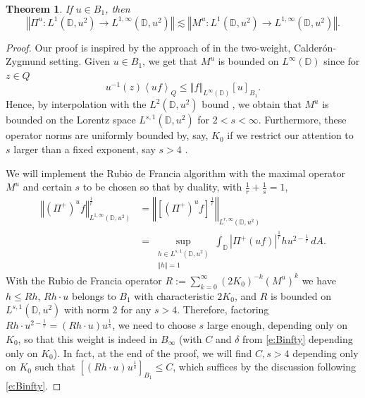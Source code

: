 \documentclass{amsart}
\newcommand{\norm}[1]{\left\Vert {#1}\right\Vert}
\newcommand{\avg}[1]{\left\langle {#1}\right\rangle}
\newtheorem{theorem}{Theorem}[section]
\theoremstyle{definition}
\numberwithin{equation}{section}
\begin{document}
\begin{theorem}\label{thm:Pi-M1}
If $u \in B_1$, then 
	\[ \norm{\Pi^u\colon L^1(\mathbb{D},u^2) \to L^{1,\infty}(\mathbb{D},u^2) } \lesssim \norm{M^u\colon L^1(\mathbb{D},u^2) \to L^{1,\infty}(\mathbb{D},u^2) }. \]
\end{theorem}
\begin{proof}
Our proof is inspired by the approach of \cite{CUMP05} in the two-weight, Calder\'on-Zygmund setting. Given $u \in B_1$, we get that $M^u$ is bounded on $L^\infty(\mathbb{D})$ since for $z \in Q$
    \[ u^{-1}(z) \avg{uf}_Q \le \norm{f}_{L^{\infty}(\mathbb{D})} [u]_{B_1}.\]
Hence, by interpolation with the $L^2(\mathbb{D},u^2)$ bound \cite{Gra14}, we obtain that $M^u$ is bounded on the Lorentz space $L^{s,1}(\mathbb{D},u^2)$ for $2<s<\infty$. Furthermore, these operator norms are uniformly bounded by, say, $K_0$ if we restrict our attention to $s$ larger than a fixed exponent, say $s>4$ \cite{CUMP05}.

 We will implement the Rubio de Francia algorithm with the maximal operator $M^u$ and certain $s$ to be chosen so that by duality, with $\frac 1r + \frac 1s =1$,
    \begin{equation}\label{e:duality} \begin{aligned} \norm{ (\Pi^+)^u f}_{L^{1,\infty}(\mathbb{D},u^2)}^{\frac 1r} &= \norm{ \left[ (\Pi^+)^u f\right]^{\frac 1r} }_{L^{r,\infty}(\mathbb{D},u^2)} \\
    &= \sup_{\substack{ h \in L^{s,1}(\mathbb{D},u^2) \\ \norm{h}=1}} \int_{\mathbb{D}} \left|\Pi^+ (uf) \right|^{\frac 1r} h u^{2- \frac 1r} \, dA. \end{aligned} \end{equation}
With the Rubio de Francia operator $R := \sum_{k=0}^\infty (2K_0)^{-k} (M^u)^k$ we have $h \le Rh$, $Rh \cdot u$ belongs to $B_1$ with characteristic $2K_0$, and $R$ is bounded on $L^{s,1}(\mathbb{D},u^2)$ with norm $2$ for any $s>4$. Therefore, factoring $Rh \cdot u^{2-\frac 1r} = (Rh \cdot u)u^{\frac 1s}$, we need to choose $s$ large enough, depending only on $K_0$, so that this weight is indeed in $B_\infty$ (with $C$ and $\delta$ from \eqref{e:Binfty} depending only on $K_0$). In fact, at the end of the proof, we will find $C,s>4$ depending only on $K_0$ such that $[(Rh \cdot u)u^{\frac 1s}]_{B_1} \le C$, which suffices by the discussion following \eqref{e:Binfty}.


\end{proof}
\end{document}
